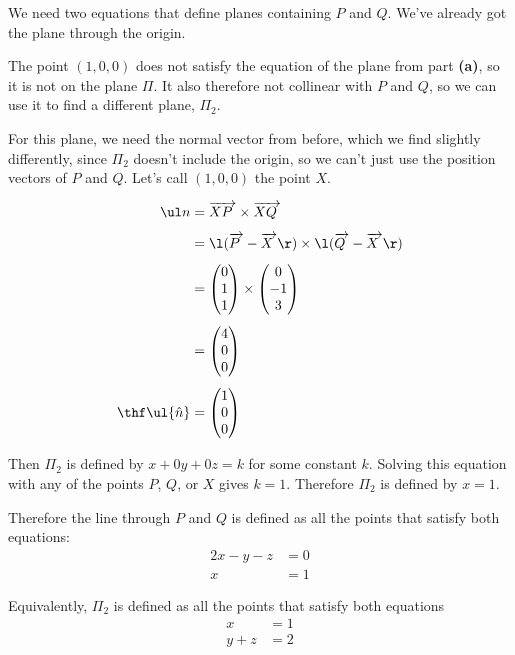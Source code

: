 \documentclass[a4paper]{article}
\begin{document}
We need two equations that define planes containing $P$ and $Q$. We've already got the plane through the origin.

The point $(1, 0, 0)$ does not satisfy the equation of the plane from part \textbf{(a)}, so it is not on the plane $\Pi$. It also therefore not collinear with $P$ and $Q$, so we can use it to find a different plane, $\Pi_2$.

For this plane, we need the normal vector from before, which we find slightly differently, since $\Pi_2$ doesn't include the origin, so we can't just use the position vectors of $P$ and $Q$. Let's call $(1, 0, 0)$ the point $X$.

\begin{align*}
\ul n &= \overrightarrow{XP\;} \times \overrightarrow{XQ\;} \\[1ex]
&= \l(\overrightarrow{P\;} - \overrightarrow{X\;}\r) \times \l(\overrightarrow{Q\;} - \overrightarrow{X\;}\r) \\[1ex]
&= \begin{pmatrix}0 \\ 1 \\ 1\end{pmatrix} \times \begin{pmatrix}0 \\ -1 \\ 3\end{pmatrix} \\[1ex]
&= \begin{pmatrix}4 \\ 0 \\ 0\end{pmatrix} \\[1ex]
\thf \ul{\hat n} &= \begin{pmatrix}1 \\ 0 \\ 0\end{pmatrix}
\end{align*}

Then $\Pi_2$ is defined by $x + 0y + 0z = k$ for some constant $k$. Solving this equation with any of the points $P$, $Q$, or $X$ gives $k=1$. Therefore $\Pi_2$ is defined by $x=1$.

Therefore the line through $P$ and $Q$ is defined as all the points that satisfy both equations: \begin{align*} 2x - y - z &= 0 \\
x &= 1
\end{align*}

Equivalently, $\Pi_2$ is defined as all the points that satisfy both equations \begin{align*}
x &= 1 \\
y + z &= 2
\end{align*}
\end{document}
